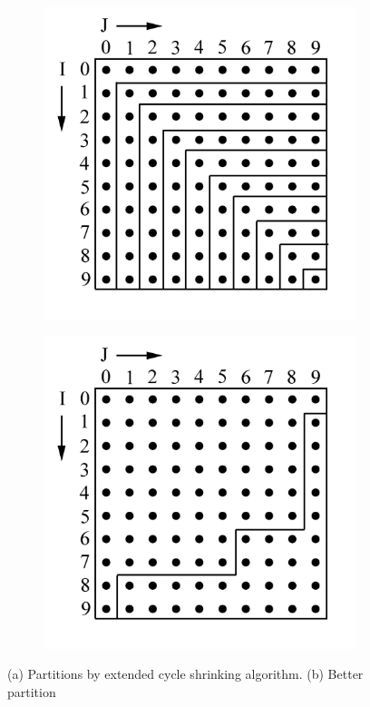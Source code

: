 \begin{figure}
\centering
\begin{subfigure}{0.5\textwidth}
  \centering
  \includegraphics[width=\textwidth]{Figures/fig1a.jpg}
  \caption{}
  \label{fig:sub1}
\end{subfigure}%
\begin{subfigure}{0.5\textwidth}
  \centering
  \includegraphics[width=\textwidth]{Figures/fig1b.jpg}
  \caption{}
  \label{fig:sub2}
\end{subfigure}
\caption{(a) Partitions by extended cycle shrinking algorithm. (b) Better partition}
\label{fig:eg_opt}
\end{figure}